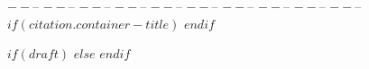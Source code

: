$--%
$--%
$--%
$--%
$--%
$--%
$--%
$--%
$--%
$--%
$--%
$--%
$--%
$--%
$--%
$--%
$--%
$--%
$--%
$--%
$if(citation.container-title)$
$endif$

$if(draft)$
$else$
\draftfalse
$endif$